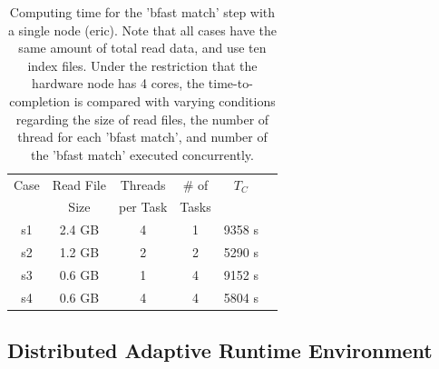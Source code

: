 \documentclass{acm_proc_article-sp}
\begin{document}



 \begin{table}
 \small
 \begin{tabular}{|c|c|c|c|c|c|} 
 \hline 
Case & Read File  & Threads & \# of   & $T_C$ \\
& Size &  per Task &  Tasks &   \\  \hline
s1 & 2.4 GB &  4 & 1 & 9358 s \\
s2 & 1.2 GB & 2 & 2 & 5290 s \\
s3 & 0.6 GB & 1 & 4 & 9152 s \\ 
s4& 0.6 GB & 4 & 4 & 5804 s \\

 \hline
 \end{tabular}
 
 \caption{Computing time for the 'bfast match' step with a single node
   (eric). Note that all cases have the same amount of total read
   data, and use ten index files.  Under the restriction that the
   hardware node has 4 cores, the time-to-completion is compared with
   varying conditions regarding the size of read files, the number of
   thread for each 'bfast match', and number of the 'bfast match'
   executed concurrently.  }
    \label{table:understandio}
\end{table}



\subsection{Distributed Adaptive Runtime Environment}
\end{document}
